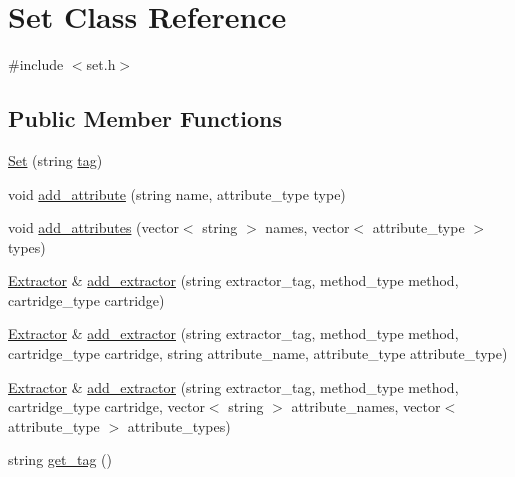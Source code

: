 \hypertarget{classSet}{}\section{Set Class Reference}
\label{classSet}


{\ttfamily \#include $<$set.\+h$>$}

\subsection*{Public Member Functions}
\begin{DoxyCompactItemize}
\item 
\hyperlink{classSet_ac47789261e41ac7aff516db5ea9e0095}{Set} (string \hyperlink{classSet_a35ba1a3d7f2fd99f7b98985b97cdd95d}{tag})
\item 
void \hyperlink{classSet_ab4e7a2a958c8cfbac96f60c7c2b20c35}{add\+\_\+attribute} (string name, attribute\+\_\+type type)
\item 
void \hyperlink{classSet_a90b6137ad3bbb7a34b50fa5e7842a685}{add\+\_\+attributes} (vector$<$ string $>$ names, vector$<$ attribute\+\_\+type $>$ types)
\item 
\hyperlink{classExtractor}{Extractor} \& \hyperlink{classSet_a26deff7e7f3319a5a4324c7de3e7b7b9}{add\+\_\+extractor} (string extractor\+\_\+tag, method\+\_\+type method, cartridge\+\_\+type cartridge)
\item 
\hyperlink{classExtractor}{Extractor} \& \hyperlink{classSet_a8d55de9a8a8f39dc567621d8640f90a2}{add\+\_\+extractor} (string extractor\+\_\+tag, method\+\_\+type method, cartridge\+\_\+type cartridge, string attribute\+\_\+name, attribute\+\_\+type attribute\+\_\+type)
\item 
\hyperlink{classExtractor}{Extractor} \& \hyperlink{classSet_acb3a45469bf84310d5d20e45118d772e}{add\+\_\+extractor} (string extractor\+\_\+tag, method\+\_\+type method, cartridge\+\_\+type cartridge, vector$<$ string $>$ attribute\+\_\+names, vector$<$ attribute\+\_\+type $>$ attribute\+\_\+types)
\item 
string \hyperlink{classSet_af7ed351b5ee2bd4f2b8c306ce16ba0a9}{get\+\_\+tag} ()
\end{DoxyCompactItemize}
